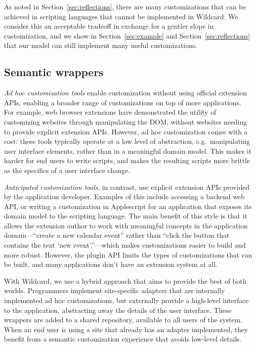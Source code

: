 \documentclass[sigplan,screen,10pt,anonymous,review]{acmart}
\begin{document}
As noted in Section~\ref{sec:reflections}, there are many customizations
that can be achieved in scripting languages that cannot be implemented
in Wildcard. We consider this an acceptable tradeoff in exchange for a
gentler slope in customization, and we show in Section~\ref{sec:example}
and Section~\ref{sec:reflections} that our model can still implement
many useful customizations.

\hypertarget{semantic-wrappers}{%
\subsection{Semantic wrappers}\label{semantic-wrappers}}

\emph{Ad hoc customization tools} enable customization without using
official extension APIs, enabling a broader range of customizations on
top of more applications. For example, web browser extensions have
demonstrated the utility of customizing websites through manipulating
the DOM, without websites needing to provide explicit extension APIs.
However, ad hoc customization comes with a cost: these tools typically
operate at a low level of abstraction, e.g.~manipulating user interface
elements, rather than in a meaningful domain model. This makes it harder
for end users to write scripts, and makes the resulting scripts more
brittle as the specifics of a user interface change.

\emph{Anticipated customization tools}, in contrast, use explicit
extension APIs provided by the application developer. Examples of this
include accessing a backend web API, or writing a customization in
Applescript for an application that exposes its domain model to the
scripting language. The main benefit of this style is that it allows the
extension author to work with meaningful concepts in the application
domain---``create a new calendar event'' rather than ``click the button
that contains the text `new event'.''---which makes customizations
easier to build and more robust. However, the plugin API limits the
types of customizations that can be built, and many applications don't
have an extension system at all.

With Wildcard, we use a hybrid approach that aims to provide the best of
both worlds. Programmers implement site-specific adapters that are
internally implemented ad hoc customizations, but externally provide a
high-level interface to the application, abstracting away the details of
the user interface. These wrappers are added to a shared repository,
available to all users of the system. When an end user is using a site
that already has an adapter implemented, they benefit from a semantic
customization experience that avoids low-level details.
\end{document}
